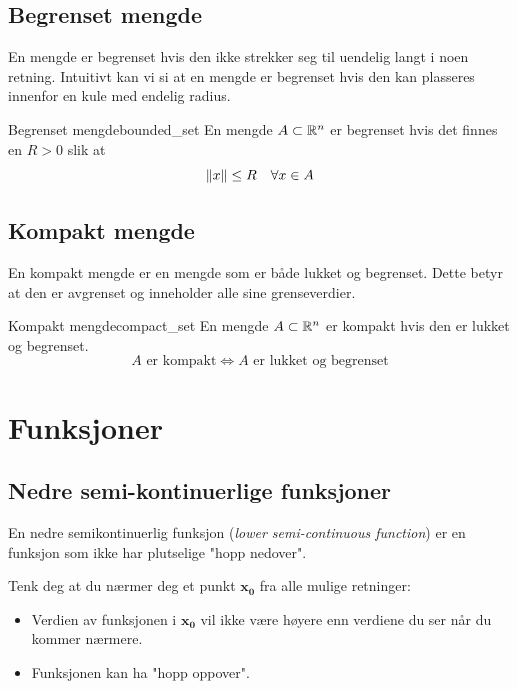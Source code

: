 \subsection{Begrenset mengde}

En mengde er begrenset hvis den ikke strekker seg til uendelig langt i noen retning.
Intuitivt kan vi si at en mengde er begrenset hvis den kan plasseres innenfor en kule med endelig radius.

\begin{definition}{Begrenset mengde}{bounded_set}
	En mengde \(A \subset \mathbb{R}^n\) er begrenset hvis det finnes en \(R > 0\) slik at
	\[
		\lVert x\rVert \leq R \quad \forall x \in A
	\]
\end{definition}

\subsection{Kompakt mengde}

En kompakt mengde er en mengde som er både lukket og begrenset. Dette betyr at den er avgrenset og inneholder alle sine grenseverdier.

\begin{definition}{Kompakt mengde}{compact_set}
	En mengde \(A \subset \mathbb{R}^n\) er kompakt hvis den er lukket og begrenset.
	\[
		A \text{ er kompakt} \Leftrightarrow A \text{ er lukket og begrenset}
	\]
\end{definition}

\section{Funksjoner}
\subsection{Nedre semi-kontinuerlige funksjoner}
En nedre semikontinuerlig funksjon (\textit{lower semi-continuous function}) er en funksjon som ikke har plutselige "hopp nedover".

Tenk deg at du nærmer deg et punkt \( \symbf{x_0} \) fra alle mulige retninger:
\begin{itemize}
	\item Verdien av funksjonen i \( \symbf{x_0} \) vil ikke være høyere enn verdiene du ser når du kommer nærmere.
	\item Funksjonen kan ha "hopp oppover".
\end{itemize}


